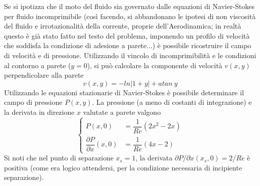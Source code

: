 Se si ipotizza che il moto del fluido sia governato dalle equazioni di 
 Navier-Stokes per fluido incomprimibile (così facendo, si abbandonano
 le ipotesi di non viscosità del fluido e irrotazionalità della corrente, 
 proprie dell'Aerodinamica; in realtà questo è già stato fatto nel testo
 del problema, imponendo un profilo di velocità che soddisfa la condizione
 di adesione a parete...) è possibile ricostruire il campo di velocità e di 
 pressione. Utilizzando il vincolo di incomprimibilità e le condizioni
 al contorno a parete ($y=0$), si può calcolare la componente di velocità
 $v(x,y)$ perpendicolare alla parete
 \begin{equation}
  v(x,y) = - ln | 1 + y | + atan \ y
 \end{equation}
 Utilizzando le equazioni stazionarie di Navier-Stokes è possibile 
 determinare il campo di pressione $P(x,y)$. La pressione (a meno di 
 costanti di integrazione) e la derivata in direzione $x$ valutate
 a parete valgono
 \begin{equation}
 \begin{cases}
  P(x,0) & = \dfrac{1}{Re} ( 2 x^2 - 2 x ) \\
  \dfrac{\partial P}{\partial x}(x,0) & = \dfrac{1}{Re} ( 4 x - 2 )
 \end{cases}
 \end{equation}
 Si noti che nel punto di separazione $x_s=1$, la derivata $\partial P/
 \partial x (x_s,0) = 2 / Re$ è positiva (come era logico attendersi, per la
 condizione necessaria di incipiente separazione).

 
 



